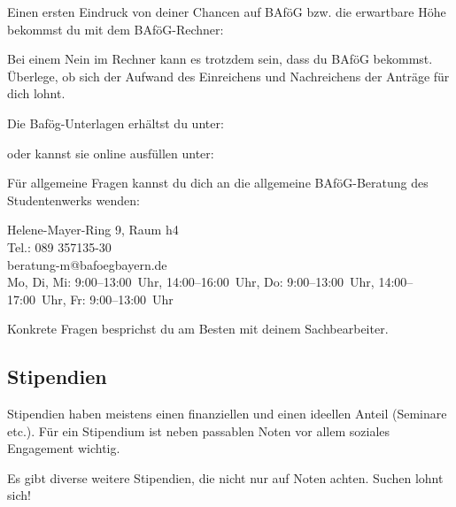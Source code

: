 Einen ersten Eindruck von deiner Chancen auf BAföG bzw. die erwartbare
Höhe bekommst du mit dem BAföG-Rechner:
\begin{urlList}
\end{urlList}

Bei einem Nein im Rechner kann es trotzdem sein, dass du BAföG
bekommst. Überlege, ob sich der Aufwand des Einreichens und
Nachreichens der Anträge für dich lohnt.

Die Bafög-Unterlagen erhältst du unter:
\begin{urlList}
\end{urlList}
oder kannst sie online ausfüllen unter: 
\begin{urlList}
\end{urlList}

Für allgemeine Fragen kannst du dich an die allgemeine BAföG-Beratung des Studentenwerks wenden:

Helene-Mayer-Ring 9, Raum h4\\
Tel.: 089 357135-30\\
beratung-m@bafoegbayern.de\\
Mo, Di, Mi: 9:00--13:00~Uhr, 14:00--16:00~Uhr, Do: 9:00--13:00~Uhr, 14:00--17:00~Uhr, Fr: 9:00--13:00~Uhr

Konkrete Fragen besprichst du am Besten mit deinem Sachbearbeiter.

\subsection{Stipendien}
Stipendien haben meistens einen finanziellen und einen ideellen Anteil
(Seminare etc.). Für ein Stipendium ist neben passablen Noten vor
allem soziales Engagement wichtig.

\begin{urlList}
\end{urlList}

Es gibt diverse weitere Stipendien, die nicht nur auf Noten achten.
Suchen lohnt sich!
